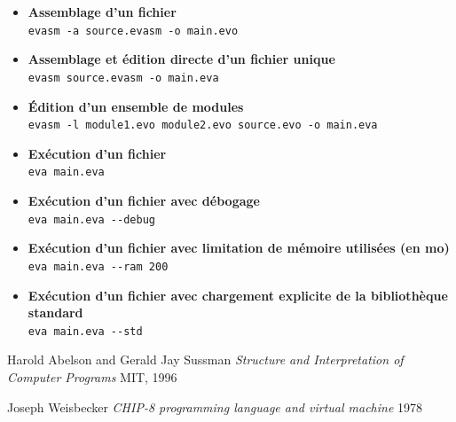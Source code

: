 \documentclass[11pt]{article}
\begin{document}
\begin{itemize}
  \item \textbf{Assemblage d'un fichier} \\
        \lstinline$evasm -a source.evasm -o main.evo$

  \item \textbf{Assemblage et édition directe d'un fichier unique} \\
        \lstinline$evasm source.evasm -o main.eva$

  \item \textbf{Édition d'un ensemble de modules} \\
        \lstinline$evasm -l module1.evo module2.evo source.evo -o main.eva$

  \item \textbf{Exécution d'un fichier} \\
        \lstinline$eva main.eva$

  \item \textbf{Exécution d'un fichier avec débogage} \\
        \lstinline$eva main.eva --debug$

  \item \textbf{Exécution d'un fichier avec limitation de mémoire utilisées (en mo)} \\
        \lstinline$eva main.eva --ram 200$

  \item \textbf{Exécution d'un fichier avec chargement explicite de la bibliothèque standard} \\
        \lstinline$eva main.eva --std$
\end{itemize}


\newpage{}

\clearpage{}

\begin{thebibliography}{XXXXXX}
  \label{chap:bib}

   Harold Abelson and Gerald Jay Sussman
  \emph{Structure and Interpretation of Computer Programs} MIT, 1996

   Joseph Weisbecker
  \emph{CHIP-8 programming language and virtual machine} 1978

\end{thebibliography}
\end{document}
